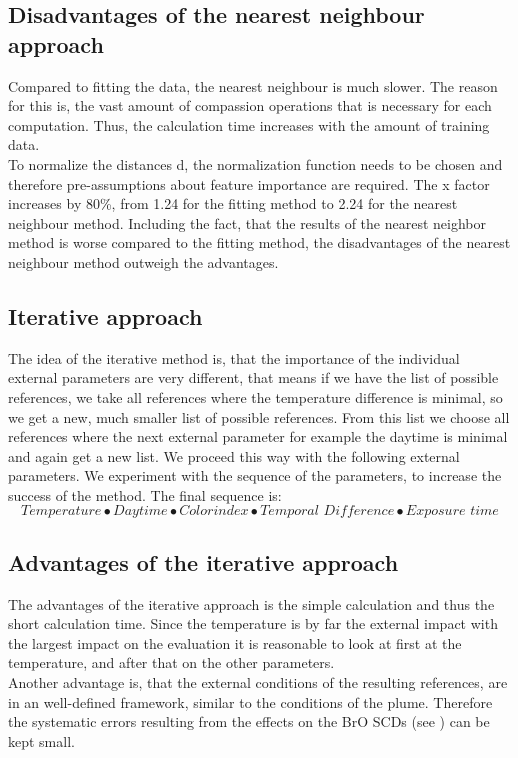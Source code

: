 \documentclass  [
  paper    = a4,
  BCOR     = 10mm,
  twoside,
  fontsize = 12pt,
  fleqn,
  toc      = bibnumbered,
  toc      = listofnumbered,
  numbers  = noendperiod,
  headings = normal,
  listof   = leveldown,
  version  = 3.03
]                                       {scrreprt}
\begin{document}
\subsection*{Disadvantages of the nearest neighbour approach}
	Compared to fitting the data, the nearest neighbour is much slower. The reason for this is, the vast amount of compassion operations that is necessary for each computation. Thus, the calculation time increases with the amount of training data.\\
	To normalize the distances d, the normalization function needs to be chosen and therefore pre-assumptions about feature importance are required.
	The x factor increases by 80\%, from 1.24 for the fitting method 
	to 2.24 for the nearest neighbour method.
	Including the fact, that the results of the nearest neighbor method is worse compared to the fitting method, the disadvantages of the nearest neighbour method outweigh the advantages.

	\subsection{Iterative approach}

	The idea of the iterative method is, that the importance of the individual external parameters are very different, that means if we have the list of possible references, we take all references where the temperature difference is minimal, so we get a new, much smaller list of possible references. From this list we choose all references where the next external parameter for example the daytime is minimal and again get a new list. We proceed this way with the following external parameters. We experiment with the sequence of the parameters, to increase the success of the method. The final sequence is:
	\begin{equation*}
	Temperature \bullet  Daytime  \bullet Colorindex \bullet Temporal\,\, Difference \bullet Exposure \,\, time
	\end{equation*} 
	\subsection*{Advantages of the iterative approach}
	The advantages of the iterative approach is the simple calculation and thus the short calculation time. Since the temperature is by far the external impact with the largest impact on the evaluation it is reasonable to look at first at the temperature, and after that on the other parameters. \\
	Another advantage is, that the external conditions of the resulting references, are in an well-defined framework, similar to the  conditions of the plume. Therefore the systematic errors resulting from the effects on the BrO SCDs (see ) can be kept small.
\end{document}
